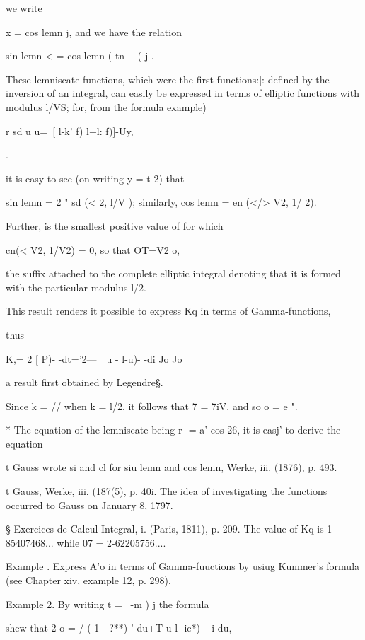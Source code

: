 we write

x = cos lemn j, and we have the relation

sin lemn < = cos lemn ( tn- - ( j .

These lemniscate functions, which were the first functions:]: defined
by the inversion of an integral, can easily be expressed in terms of
elliptic functions with modulus l/VS; for, from the formula 
example)

r sd u u=\ [ l-k' f) l+l: f)]-Uy,

.

it is easy to see (on writing y = t \/2) that

sin lemn = 2 " sd (< \/2, l/V ); similarly, cos lemn = en (</> V2, 1/
2).

Further, is the smallest positive value of for which

cn(< V2, 1/V2) = 0, so that OT=V2 o,

the suffix attached to the complete elliptic integral denoting that it
is formed with the particular modulus l/\/2.

This result renders it possible to express Kq in terms of
Gamma-functions,

thus

K,= 2 [ P)- -dt='2---\ \ u - l-u)- -di Jo Jo

a result first obtained by Legendre§.

Since k = // when k = l/\/2, it follows that 7 = 7iV. and so o = e ".

* The equation of the lemniscate being r- = a' cos 26, it is easj' to
derive the equation


t Gauss wrote si and cl for siu lemn and cos lemn, Werke, iii. (1876),
p. 493.

t Gauss, Werke, iii. (187(5), p. 40i. The idea of investigating the
functions occurred to Gauss on January 8, 1797.

§ Exercices de Calcul Integral, i. (Paris, 1811), p. 209. The value of
Kq is 1-85407468... while 07 = 2-62205756....

%
%

Example . Express A'o in terms of Gamma-fuuctions by usiug Kummer's
formula (see Chapter xiv, example 12, p. 298).

Example 2. By writing t = \ -m ) j the formula

shew that 2 o = / ( 1 - ?**) ' du+T u l- ic*) ~ i du,

